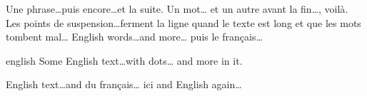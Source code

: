 \documentclass{article}
\begin{document}
Une phrase\ldots puis encore\ldots et la suite. Un mot\dots{} et un autre\textellipsis{} avant la fin\ldots, voil\`a.
Les points de suspension\ldots ferment la ligne quand le texte est long et que les mots tombent mal\ldots
\foreignlanguage{english}{English words\ldots and more\ldots} puis le fran\c{c}ais\ldots

\begin{otherlanguage*}{english}
Some English text\ldots with dots\dots{} and more\textellipsis{} in it.
\end{otherlanguage*}

English text\ldots and \foreignlanguage{french}{du fran\c{c}ais\ldots{} ici} and English again\ldots
\end{document}
